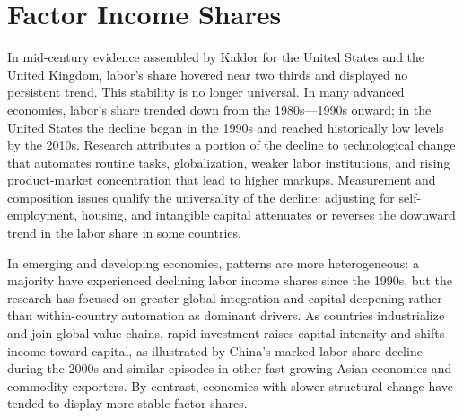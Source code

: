 \documentclass[\topdir/lecture\_notes.tex]{subfiles}
\begin{document}
\section{Factor Income Shares}

In mid-century evidence assembled by Kaldor for the United States and the United Kingdom, labor's share hovered near two thirds and displayed no persistent trend.%
This stability is no longer universal.
In many advanced economies, labor's share trended down from the 1980s---1990s onward; in the United States the decline began in the 1990s and reached historically low levels by the 2010s.
Research attributes a portion of the decline to technological change that automates routine tasks, globalization, weaker labor institutions, and rising product-market concentration that lead to higher markups.
Measurement and composition issues qualify the universality of the decline: adjusting for self-employment, housing, and intangible capital attenuates or reverses the downward trend in the labor share in some countries.

In emerging and developing economies, patterns are more heterogeneous: a majority have experienced declining labor income shares since the 1990s, but the research has focused on greater global integration and capital deepening rather than within-country automation as  dominant drivers.
As countries industrialize and join global value chains, rapid investment raises capital intensity and shifts income toward capital, as illustrated by China's marked labor-share decline during the 2000s and similar episodes in other fast-growing Asian economies and commodity exporters.
By contrast, economies with slower structural change have tended to display more stable factor shares.
\end{document}
